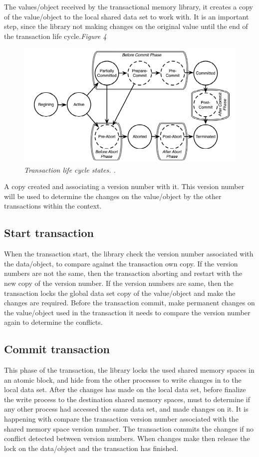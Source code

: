 \documentclass[12pt]{article}
\begin{document}
The values/object received by the transactional memory library, it creates a copy of the value/object to the local shared data set to work with. It is an important step, since the library not making changes on the original value until the end of the transaction life cycle.\textit{\color{gray}Figure 4}

\begin{figure}[h!]
\centering
\includegraphics[scale=0.4]{Pictures/transactionLifeCycle.png}
\caption{\textit{\color{gray}Transaction life cycle states. \cite{DLUATM}.}}
\end{figure}

A copy created and associating a version number with it. This version number will be used to determine the changes on the value/object by the other transactions within the context.

\subsection{Start transaction}
When the transaction start, the library check the version number associated with the data/object, to compare against the transaction own copy. If the version numbers are not the same, then the transaction aborting and restart with the new copy of the version number. If the version numbers are same, then the transaction locks the global data set copy of the value/object and make the changes are required. Before the transaction commit, make permanent changes on the value/object used in the transaction it needs to compare the version number again to determine the conflicts.   

\subsection{Commit transaction}
This phase of the transaction, the library locks the used shared memory spaces in an atomic block, and hide from the other processes to write changes in to the local data set. After the changes has made on the local data set, before finalize the write process to the destination shared memory spaces, must to determine if any other process had accessed the same data set, and made changes on it. It is happening with compare the transaction version number associated with the shared memory space version number. The transaction commits the changes if no conflict detected between version numbers. When changes make then release the lock on the data/object and the transaction has finished.\\ 
\end{document}
